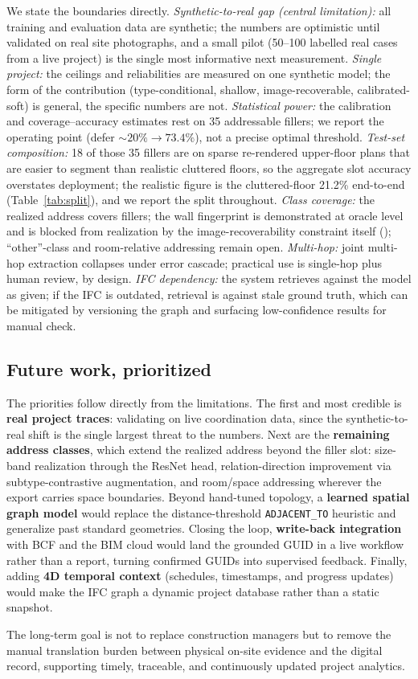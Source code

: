 We state the boundaries directly. \emph{Synthetic-to-real gap (central limitation):} all training and
evaluation data are synthetic; the numbers are optimistic until validated on real site photographs,
and a small pilot (50--100 labelled real cases from a live project) is the single most informative
next measurement. \emph{Single project:} the ceilings and reliabilities are measured on one synthetic
model; the form of the contribution (type-conditional, shallow, image-recoverable, calibrated-soft) is
general, the specific numbers are not. \emph{Statistical power:} the calibration and
coverage--accuracy estimates rest on 35 addressable fillers; we report the operating point (defer
${\sim}20\% \to 73.4\%$), not a precise optimal threshold. \emph{Test-set composition:} 18 of those
35 fillers are on sparse re-rendered upper-floor plans that are easier to segment than realistic
cluttered floors, so the aggregate slot accuracy overstates deployment; the realistic figure is the
cluttered-floor 21.2\% end-to-end (Table~\ref{tab:split}), and we report the split throughout. \emph{Class coverage:} the realized address
covers fillers; the wall fingerprint is demonstrated at oracle level and is blocked from realization
by the image-recoverability constraint itself (); ``other''-class and
room-relative addressing remain open. \emph{Multi-hop:} joint multi-hop extraction collapses under
error cascade; practical use is single-hop plus human review, by design. \emph{IFC dependency:} the
system retrieves against the model as given; if the IFC is outdated, retrieval is against stale ground
truth, which can be mitigated by versioning the graph and surfacing low-confidence results for manual check.

\subsection{Future work, prioritized}
\label{sec:future}

The priorities follow directly from the limitations. The first and most credible is \textbf{real
project traces}: validating on live coordination data, since the synthetic-to-real shift is the
single largest threat to the numbers. Next are the \textbf{remaining address classes}, which extend
the realized address beyond the filler slot: size-band realization through the ResNet head,
relation-direction improvement via subtype-contrastive augmentation, and room/space addressing
wherever the export carries space boundaries. Beyond hand-tuned topology, a \textbf{learned spatial
graph model} would replace the distance-threshold \texttt{ADJACENT\_TO} heuristic and generalize past
standard geometries. Closing the loop, \textbf{write-back integration} with BCF and the BIM cloud
would land the grounded GUID in a live workflow rather than a report, turning confirmed GUIDs into
supervised feedback. Finally, adding \textbf{4D temporal context} (schedules, timestamps, and
progress updates) would make the IFC graph a dynamic project database rather than a static
snapshot.

The long-term goal is not to replace construction managers but to remove the manual translation
burden between physical on-site evidence and the digital record, supporting timely, traceable, and
continuously updated project analytics.
